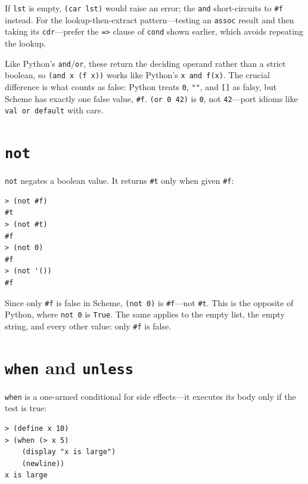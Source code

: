 If \texttt{lst} is empty, \texttt{(car lst)} would raise an error; the \texttt{and} short-circuits to \texttt{\#f} instead. For the lookup-then-extract pattern---testing an \texttt{assoc} result and then taking its \texttt{cdr}---prefer the \texttt{=>} clause of \texttt{cond} shown earlier, which avoids repeating the lookup.

\begin{note}
Like Python's \texttt{and}/\texttt{or}, these return the deciding operand rather than a strict boolean, so \texttt{(and x (f x))} works like Python's \texttt{x and f(x)}. The crucial difference is what counts as false: Python treats \texttt{0}, \texttt{""}, and \texttt{[]} as falsy, but Scheme has exactly one false value, \texttt{\#f}. \texttt{(or 0 42)} is \texttt{0}, not \texttt{42}---port idioms like \texttt{val or default} with care.
\end{note}

\section{\texttt{not}}

\texttt{not} negates a boolean value. It returns \texttt{\#t} only when given \texttt{\#f}:

\begin{lstlisting}[style=repl]
> (not #f)
#t
> (not #t)
#f
> (not 0)
#f
> (not '())
#f
\end{lstlisting}

\begin{warning}
Since only \texttt{\#f} is false in Scheme, \texttt{(not 0)} is \texttt{\#f}---not \texttt{\#t}. This is the opposite of Python, where \texttt{not 0} is \texttt{True}. The same applies to the empty list, the empty string, and every other value: only \texttt{\#f} is false.
\end{warning}

\section{\texttt{when} and \texttt{unless}}

\texttt{when} is a one-armed conditional for side effects---it executes its body only if the test is true:

\begin{lstlisting}[style=repl]
> (define x 10)
> (when (> x 5)
    (display "x is large")
    (newline))
x is large
\end{lstlisting}

